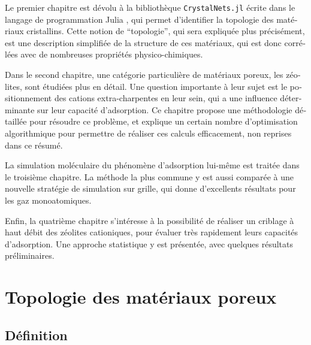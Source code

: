 \documentclass[thesis]{subfiles}
\begin{document}
\begin{otherlanguage}{french}
Le premier chapitre est dévolu à la bibliothèque \texttt{CrystalNets.jl} \autocite{CrystalNets} écrite dans le langage de programmation Julia \autocite{Julia}, qui permet d'identifier la topologie des matériaux cristallins. Cette notion de ``topologie'', qui sera expliquée plus précisément, est une description simplifiée de la structure de ces matériaux, qui est donc corrélées avec de nombreuses propriétés physico-chimiques.

Dans le second chapitre, une catégorie particulière de matériaux poreux, les zéolites, sont étudiées plus en détail. Une question importante à leur sujet est le positionnement des cations extra-charpentes en leur sein, qui a une influence déterminante sur leur capacité d'adsorption. Ce chapitre propose une méthodologie détaillée pour résoudre ce problème, et explique un certain nombre d'optimisation algorithmique pour permettre de réaliser ces calculs efficacement, non reprises dans ce résumé.

La simulation moléculaire du phénomène d'adsorption lui-même est traitée dans le troisième chapitre. La méthode la plus commune y est aussi comparée à une nouvelle stratégie de simulation sur grille, qui donne d'excellents résultats pour les gaz monoatomiques.

Enfin, la quatrième chapitre s'intéresse à la possibilité de réaliser un criblage à haut débit des zéolites cationiques, pour évaluer très rapidement leurs capacités d'adsorption. Une approche statistique y est présentée, avec quelques résultats préliminaires.

\section{Topologie des matériaux poreux}

\subsection{Définition}


\end{otherlanguage}
\end{document}
